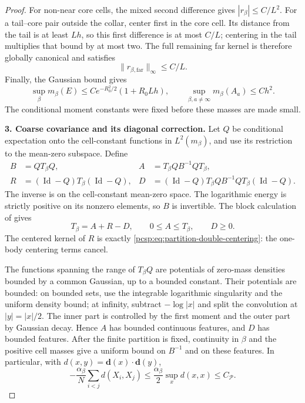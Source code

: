 \documentclass[11pt,reqno]{amsart}
\numberwithin{equation}{section}
\theoremstyle{plain}
\theoremstyle{definition}
\newcommand{\Id}{\operatorname{Id}}
\newcommand{\be}{\beta}
\newcommand{\step}[1]{\par\medskip\noindent\textbf{#1}}
\begin{document}
\begin{proof}
For non-near core cells, the mixed second difference gives $|r_\be|\leq C/L^2$. For a tail--core pair outside the collar, center first in the core cell. Its distance from the tail is at least $Lh$, so this first difference is at most $C/L$; centering in the tail multiplies that bound by at most two. The full remaining far kernel is therefore globally canonical and satisfies
\begin{equation}\label{pcsp:eq:partition-far-bound}
 \|r_{\be,\mathrm{far}}\|_\infty\leq C/L.
\end{equation}
Finally, the Gaussian bound gives
\begin{equation}\label{pcsp:eq:partition-cell-masses}
 \sup_\be m_\be(E)\leq C e^{-R_0^2/2}(1+R_0Lh),
 \qquad
 \sup_{\be,a\ne\infty}m_\be(A_a)\leq Ch^2.
\end{equation}
The conditional moment constants were fixed before these masses are made small.

\step{3. Coarse covariance and its diagonal correction.}
Let $Q$ be conditional expectation onto the cell-constant functions in $L^2(m_\be)$, and use its restriction to the mean-zero subspace. Define
\begin{equation}\label{pcsp:eq:partition-operators}
 \begin{aligned}
 B&=QT_\be Q, & A&=T_\be QB^{-1}QT_\be,\\
 R&=(\Id-Q)T_\be(\Id-Q), &
 D&=(\Id-Q)T_\be QB^{-1}QT_\be(\Id-Q).
 \end{aligned}
\end{equation}
The inverse is on the cell-constant mean-zero space. The logarithmic energy is strictly positive on its nonzero elements, so $B$ is invertible. The block calculation of  gives
\begin{equation}\label{pcsp:eq:regression-decomposition}
 T_\be=A+R-D,
 \qquad
 0\leq A\leq T_\be,
 \qquad
 D\geq0.
\end{equation}
The centered kernel of $R$ is exactly \eqref{pcsp:eq:partition-double-centering}: the one-body centering terms cancel.

The functions spanning the range of $T_\be Q$ are potentials of zero-mass densities bounded by a common Gaussian, up to a bounded constant. Their potentials are bounded: on bounded sets, use the integrable logarithmic singularity and the uniform density bound; at infinity, subtract $-\log|x|$ and split the convolution at $|y|=|x|/2$. The inner part is controlled by the first moment and the outer part by Gaussian decay. Hence $A$ has bounded continuous features, and $D$ has bounded features. After the finite partition is fixed, continuity in $\be$ and the positive cell masses give a uniform bound on $B^{-1}$ and on these features. In particular, with $d(x,y)=\mathbf d(x)\cdot\mathbf d(y)$,
\begin{equation}\label{pcsp:eq:partition-diagonal-cost}
 -\frac{\alpha_\be}{N}\sum_{i<j}d(X_i,X_j)
 \leq \frac{\alpha_\be}{2}\sup_x d(x,x)\leq C_{\mathscr P}.
\end{equation}


\end{proof}
\end{document}

